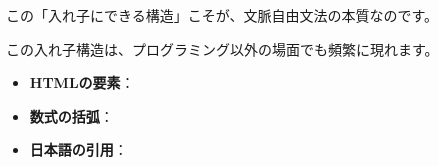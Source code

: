 \begin{Shaded}
\begin{Highlighting}[]
\NormalTok{) \{}
    \NormalTok{) \{}
        \NormalTok{(}\NormalTok{);}
\NormalTok{    \}}
\NormalTok{\}}
\end{Highlighting}
\end{Shaded}

この「入れ子にできる構造」こそが、文脈自由文法の本質なのです。

この入れ子構造は、プログラミング以外の場面でも頻繁に現れます。

\begin{itemize}
\tightlist
\item
  \textbf{HTMLの要素}：
\end{itemize}

\begin{Shaded}
\begin{Highlighting}[]
\KeywordTok{\textgreater{}}
\end{Highlighting}
\end{Shaded}

\begin{itemize}
\tightlist
\item
  \textbf{数式の括弧}：
\end{itemize}

\begin{Shaded}
\begin{Highlighting}[]
\KeywordTok{((}
\end{Highlighting}
\end{Shaded}

\begin{itemize}
\tightlist
\item
  \textbf{日本語の引用}：
\end{itemize}

